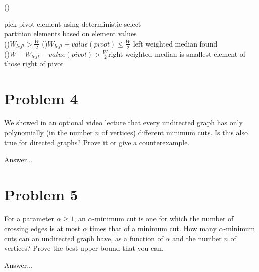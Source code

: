 \documentclass[10pt]{article}
\begin{document}
\Fn(){}{
	\BlankLine
	
	{pick pivot element using deterministic select}\\
	{partition elements based on element values}\\
	\If(){$W_{left} > \frac{W}{2}$}{\;
	}
	\If(){$W_{left} + value(pivot) \leq \frac{W}{2}$}{\;
	}
	{left weighted median found}\\
	\If(){$W - W_{left} - value(pivot) > \frac{W}{2}$}{right weighted median is smallest element of those right of pivot\;
	}
}

\section*{\normalsize Problem 4}

We showed in an optional video lecture that every undirected graph has only polynomially (in the number $n$ of vertices) different minimum cuts. Is this also true for directed graphs? Prove it or give a counterexample.
\bigskip

Answer...

\section*{\normalsize Problem 5}

For a parameter $\alpha \geq 1$, an $\alpha$-minimum cut is one for which the number of crossing edges is at most $\alpha$ times that of a minimum cut. How many $\alpha$-minimum cuts can an undirected graph have, as a function of $\alpha$ and the number $n$ of vertices? Prove the best upper bound that you can.
\bigskip

Answer...
\end{document}
